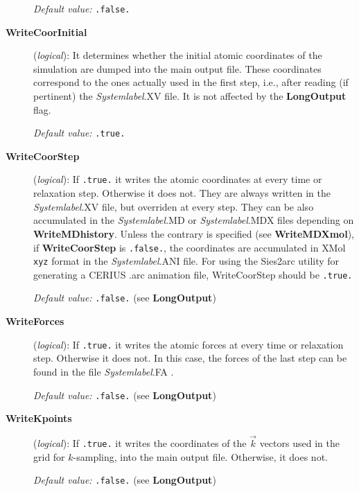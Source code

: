 \documentclass[11pt]{article}
\begin{document}
\begin{description}
{\it Default value:} {\tt .false.}


\item[{\bf WriteCoorInitial}] ({\it logical}):
It determines whether the initial atomic coordinates of the simulation are
dumped into the main output file. These coordinates correspond to the
ones actually used in the first step, i.e., after reading (if pertinent)
the {\it Systemlabel}.XV file. It is not affected by the {\bf LongOutput}
flag.

{\it Default value:} {\tt .true.}

 
\item[{\bf WriteCoorStep}] ({\it logical}):
If {\tt .true.} it writes the atomic coordinates at every 
time or relaxation step. Otherwise it does not. They are
always written in the {\it Systemlabel}.XV file, but
overriden at every step. They can be also accumulated
in the {\it Systemlabel}.MD or {\it Systemlabel}.MDX files
depending on {\bf WriteMDhistory}. Unless the contrary is specified
(see {\bf WriteMDXmol}), if {\bf WriteCoorStep} is {\tt .false.}, 
the coordinates are accumulated in {\sc XMol} {\tt xyz} format in the
{\it Systemlabel}.ANI file.
For using the {\sc Sies2arc} utility
for generating a CERIUS .arc animation file,
WriteCoorStep should be {\tt .true.}

{\it Default value:} {\tt .false.} (see {\bf LongOutput})
 
 
\item[{\bf WriteForces}] ({\it logical}):
If {\tt .true.} it writes the atomic forces at every
time or relaxation step. Otherwise it does not. In this case,
the forces of the last step can be found in the file {\it Systemlabel}.FA .
 
{\it Default value:} {\tt .false.} (see {\bf LongOutput})

\item[{\bf WriteKpoints}] ({\it logical}):
If {\tt .true.} it writes the coordinates of the $\vec k$ vectors
used in the grid for $k$-sampling, into the main output file.
Otherwise, it does not.

{\it Default value:} {\tt .false.} (see {\bf LongOutput})


\end{description}
\end{document}
